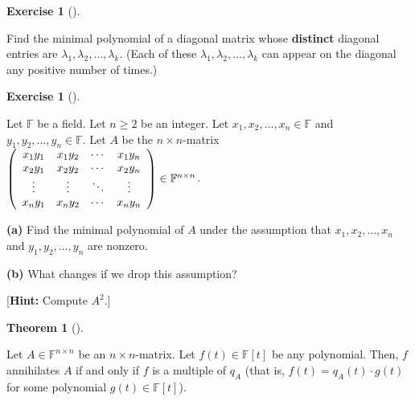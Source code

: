 \documentclass[numbers=enddot,12pt,final,onecolumn,notitlepage]{scrartcl}%
\newcounter{exer}
\numberwithin{exer}{subsection}
\theoremstyle{definition}
\newtheorem{theo}{Theorem}[subsection]
\newenvironment{theorem}[1][]
{\begin{theo}[#1]\begin{leftbar}}
{\end{leftbar}\end{theo}}
\newtheorem{exmp}[exer]{Exercise}
\newenvironment{exercise}[1][]
{\begin{exmp}[#1]\begin{leftbar}}
{\end{leftbar}\end{exmp}}
\begin{document}
\begin{exercise}
 Find the minimal polynomial of a diagonal matrix whose
\textbf{distinct} diagonal entries are $\lambda_{1},\lambda_{2},\ldots
,\lambda_{k}$. (Each of these $\lambda_{1},\lambda_{2},\ldots,\lambda_{k}$ can
appear on the diagonal any positive number of times.)
\end{exercise}

\begin{exercise}
 Let $\mathbb{F}$ be a field. Let $n\geq2$ be an integer. Let
$x_{1},x_{2},\ldots,x_{n}\in\mathbb{F}$ and $y_{1},y_{2},\ldots,y_{n}%
\in\mathbb{F}$. Let $A$ be the $n\times n$-matrix $\left(
\begin{array}
[c]{cccc}%
x_{1}y_{1} & x_{1}y_{2} & \cdots & x_{1}y_{n}\\
x_{2}y_{1} & x_{2}y_{2} & \cdots & x_{2}y_{n}\\
\vdots & \vdots & \ddots & \vdots\\
x_{n}y_{1} & x_{n}y_{2} & \cdots & x_{n}y_{n}%
\end{array}
\right)  \in\mathbb{F}^{n\times n}$. \medskip

\textbf{(a)} Find the minimal polynomial of $A$ under the assumption that
$x_{1},x_{2},\ldots,x_{n}$ and $y_{1},y_{2},\ldots,y_{n}$ are nonzero.
\medskip

\textbf{(b)} What changes if we drop this assumption? \medskip

[\textbf{Hint:} Compute $A^{2}$.]
\end{exercise}

\begin{theorem}
\label{thm.jnf.mipo.annih-iff-mult}Let $A\in\mathbb{F}^{n\times n}$ be an
$n\times n$-matrix. Let $f\left(  t\right)  \in\mathbb{F}\left[  t\right]  $
be any polynomial. Then, $f$ annihilates $A$ if and only if $f$ is a multiple
of $q_{A}$ (that is, $f\left(  t\right)  =q_{A}\left(  t\right)  \cdot
g\left(  t\right)  $ for some polynomial $g\left(  t\right)  \in
\mathbb{F}\left[  t\right]  $).
\end{theorem}
\end{document}
